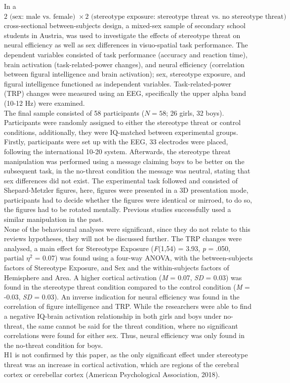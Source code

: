 \documentclass[
  stu,floatsintext]{apa7}
\begin{document}
In a \(2 \text{ (sex: male vs. female) } \times 2 \text{ (stereotype exposure: stereotype threat vs. no stereotype threat) }\) cross-sectional between-subjects design, a mixed-sex sample of secondary school students in Austria, was used to investigate the effects of stereotype threat on neural efficiency as well as sex differences in visuo-spatial task performance.
The dependent variables consisted of task performance (accuracy and reaction time), brain activation (task-related-power changes), and neural efficiency (correlation between figural intelligence and brain activation); sex, stereotype exposure, and figural intelligence functioned as independent variables.
Task-related-power (TRP) changes were measured using an EEG, specifically the upper alpha band (10-12 Hz) were examined.\\
The final sample consisted of 58 participants (\(N = 58\); 26 girls, 32 boys).
Participants were randomly assigned to either the stereotype threat or control conditions, additionally, they were IQ-matched between experimental groups.\\
Firstly, participants were set up with the EEG, 33 electrodes were placed, following the international 10-20 system.
Afterwards, the stereotype threat manipulation was performed using a message claiming boys to be better on the subsequent task, in the no-threat condition the message was neutral, stating that sex differences did not exist.
The experimental task followed and consisted of Shepard-Metzler figures, here, figures were presented in a 3D presentation mode, participants had to decide whether the figures were identical or mirroed, to do so, the figures had to be rotated mentally.
Previous studies successfully used a similar manipulation in the past.\\
None of the behavioural analyses were significant, since they do not relate to this reviews hypotheses, they will not be discussed further.
The TRP changes were analysed, a main effect for Stereotype Exposure (\emph{F}(1,54) = 3.93, \emph{p} = .050, \(\text{partial }\eta^{2}\) = 0.07) was found using a four-way ANOVA, with the between-subjects factors of Stereotype Exposure, and Sex and the within-subjects factors of Hemisphere and Area.
A higher cortical activation (\emph{M} = 0.07, \emph{SD} = 0.03) was found in the stereotype threat condition compared to the control condition (\emph{M} = -0.03, \emph{SD} = 0.03).
An inverse indication for neural efficiency was found in the correlation of figure intelligence and TRP.
While the researchers were able to find a negative IQ-brain activation relationship in both girls and boys under no-threat, the same cannot be said for the threat condition, where no significant correlations were found for either sex.
Thus, neural efficiency was only found in the no-threat condition for boys.\\
H1 is not confirmed by this paper, as the only significant effect under stereotype threat was an increase in cortical activation, which are regions of the cerebral cortex or cerebellar cortex (American Psychological Association, 2018).
\end{document}
